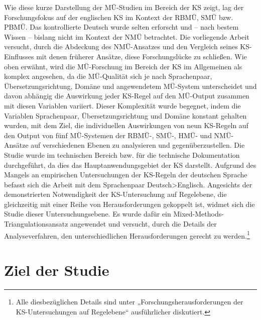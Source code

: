 Wie diese kurze Darstellung der MÜ-Studien im Bereich der KS zeigt, lag der Forschungsfokus auf der englischen KS im Kontext der RBMÜ, SMÜ bzw. PBMÜ. Das kontrollierte Deutsch wurde selten erforscht und – nach bestem Wissen – bislang nicht im Kontext der NMÜ betrachtet. Die vorliegende Arbeit versucht, durch die Abdeckung des NMÜ-Ansatzes und den Vergleich seines KS-Einflusses mit denen früherer Ansätze, diese Forschungslücke zu schließen. Wie oben erwähnt, wird die MÜ-Forschung im Bereich der KS im Allgemeinen als komplex angesehen, da die MÜ-Qualität sich je nach Sprachenpaar, Übersetzungsrichtung, Domäne und angewendetem MÜ-System unterscheidet und davon abhängig die Auswirkung jeder KS-Regel auf den MÜ-Output zusammen mit diesen Variablen variiert. Dieser Komplexität wurde begegnet, indem die Variablen Sprachenpaar, Übersetzungsrichtung und Domäne konstant gehalten wurden, mit dem Ziel, die individuellen Auswirkungen von neun KS-Regeln auf den Output von fünf MÜ-Systemen der RBMÜ-, SMÜ-, HMÜ- und NMÜ-Ansätze auf verschiedenen Ebenen zu analysieren und gegenüberzustellen. Die Studie wurde im technischen Bereich bzw. für die technische Dokumentation durchgeführt, da dies das Hauptanwendungsgebiet der KS darstellt. Aufgrund des Mangels an empirischen Untersuchungen der KS-Regeln der deutschen Sprache befasst sich die Arbeit mit dem Sprachenpaar Deutsch>Englisch. Angesichts der demonstrierten Notwendigkeit der KS-Untersuchung auf Regelebene, die gleichzeitig mit einer Reihe von Herausforderungen gekoppelt ist, widmet sich die Studie dieser Untersuchungsebene. Es wurde dafür ein Mixed-Methods-Triangulationsansatz angewendet und versucht, durch die Details der Analyseverfahren, den unterschiedlichen Herausforderungen gerecht zu werden.\footnote{{{{Alle diesbezüglichen Details sind unter  „Forschungsherausforderungen der KS-Untersuchungen auf Regelebene“ ausführlicher diskutiert.}}}}

\section{{{Ziel der Studie}}}

